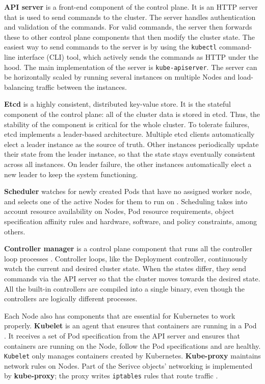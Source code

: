 \documentclass[english, 12pt, a4paper, sci, utf8, a-2b, online]{aaltothesis}
\begin{document}
\textbf{API server} is a front-end component of the control plane.
It is an HTTP server that is used to send commands to the cluster.
The server handles authentication and validation of the commands.
For valid commands, the server then forwards these to other control plane components that then modify the cluster state.
The easiest way to send commands to the server is by using the \texttt{kubectl} command-line interface (CLI) tool, which actively sends the commands as HTTP under the hood.
The main implementation of the server is \texttt{kube-apiserver}.
The server can be horizontally scaled by running several instances on multiple Nodes and load-balancing traffic between the instances.

\textbf{Etcd} \cite{etcd} is a highly consistent, distributed key-value store.
It is the stateful component of the control plane: all of the cluster data is stored in etcd.
Thus, the stability of the component is critical for the whole cluster.
To tolerate failures, etcd implements a leader-based architecture.
Multiple etcd clients automatically elect a leader instance as the source of truth.
Other instances periodically update their state from the leader instance, so that the state stays eventually consistent across all instances.
On leader failure, the other instances automatically elect a new leader to keep the system functioning.

\textbf{Scheduler} watches for newly created Pods that have no assigned worker node, and selects one of the active Nodes for them to run on \cite{k8s-docs-control-plane}.
Scheduling takes into account resource availability on Nodes, Pod resource requirements, object specification affinity rules and hardware, software, and policy constraints, among others.

\textbf{Controller manager} is a control plane component that runs all the controller loop processes \cite{k8s-docs-control-plane}.
Controller loops, like the Deployment controller, continuously watch the current and desired cluster state.
When the states differ, they send commands via the API server so that the cluster moves towards the desired state.
All the built-in controllers are compiled into a single binary, even though the controllers are logically different processes.

Each Node also has components that are essential for Kubernetes to work properly.
\textbf{Kubelet} is an agent that ensures that containers are running in a Pod \cite{k8s-docs-control-plane}.
It receives a set of Pod specification from the API server and ensures that containers are running on the Node, follow the Pod specifications and are healthy.
\texttt{Kubelet} only manages containers created by Kubernetes.
\textbf{Kube-proxy} maintains network rules on Nodes.
Part of the Serivce objects' networking is implemented by \textbf{kube-proxy}; the proxy writes \texttt{iptables} rules that route traffic \cite{cilium-proxy-free}.
\end{document}
